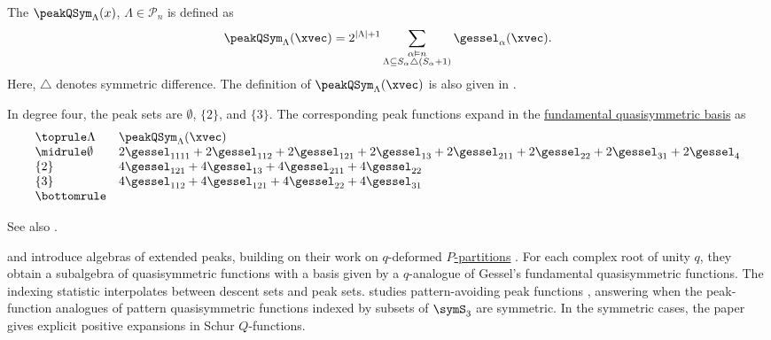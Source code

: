 The  
$\peakQSym_\Lambda(x)$, $\Lambda\in \mathcal{P}_n $ is defined as 
\[
  \peakQSym_{\Lambda}(\xvec) = 2^{|\Lambda|+1} \sum_{\substack{ \alpha \vDash n \\ \Lambda \subseteq S_{\alpha} \triangle (S_{\alpha}+1) }}
  \gessel_{\alpha}(\xvec).
\]
Here, $\triangle$ denotes symmetric difference.
The definition of $\peakQSym_\Lambda(\xvec)$ is also given in \cite[Prop. 3.5]{Stembridge1997}.

In degree four, the peak sets are $\emptyset$, $\{2\}$, and $\{3\}$.
The corresponding peak functions expand in the
\hyperref[gessel]{fundamental quasisymmetric basis} as
\[
\begin{array}{ll}
\toprule
\Lambda & \peakQSym_\Lambda(\xvec) \\
\midrule
\emptyset
  & 2\gessel_{1111}+2\gessel_{112}+2\gessel_{121}+2\gessel_{13}
    +2\gessel_{211}+2\gessel_{22}+2\gessel_{31}+2\gessel_{4} \\
\{2\}
  & 4\gessel_{121}+4\gessel_{13}+4\gessel_{211}+4\gessel_{22} \\
\{3\}
  & 4\gessel_{112}+4\gessel_{121}+4\gessel_{22}+4\gessel_{31} \\
\bottomrule
\end{array}
\]

See also \cite{GesselZhuang2018}.

 and  introduce algebras
of extended peaks, building on their work on $q$-deformed
\hyperref[pPartition]{$P$-partitions} \cite{GrinbergVassilieva2023x}.
For each complex root of unity $q$, they obtain a subalgebra of
quasisymmetric functions with a basis given by a $q$-analogue of Gessel's
fundamental quasisymmetric functions.  The indexing statistic interpolates
between descent sets and peak sets.
 studies pattern-avoiding peak functions
\cite{SlatteryHolmes2025x}, answering when the peak-function analogues of
pattern quasisymmetric functions indexed by subsets of $\symS_3$ are
symmetric.  In the symmetric cases, the paper gives explicit positive
expansions in Schur $Q$-functions.

